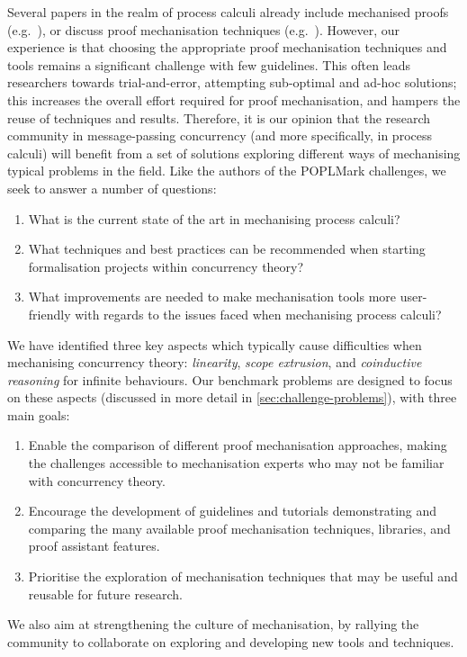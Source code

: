 \documentclass[runningheads]{llncs}
\begin{document}
Several papers in the realm of process calculi already include mechanised proofs
(e.g.~\cite{Castro-Perez2021,Castro2020,lmcs:9985,
  DBLP:journals/jar/CruzFilipeMP23, Tirore:2023}), or
discuss proof mechanisation techniques
(e.g.~\cite{Bengtson2016, Gay2001,
  Thiemann2019, DBLP:conf/forte/ZalakainD21}).  However, our
experience is that choosing the appropriate proof mechanisation techniques and
tools remains a significant challenge with few guidelines.  This often leads
researchers towards trial-and-error, attempting sub-optimal and ad-hoc
solutions; this increases the overall effort required for proof mechanisation,
and hampers the reuse of techniques and results.
%
Therefore, it is our opinion that the research community in message-passing
concurrency (and more specifically, in process calculi) will benefit from a set
of solutions exploring different ways of mechanising typical problems in the
field.
Like the authors of the POPLMark challenges, we seek to
answer a number of questions:
\begin{enumerate}[label=\textbf{(Q\arabic*)},leftmargin=10mm]
\item\label{item:rq1} What is the current state of the art in mechanising process calculi?
\item\label{item:rq2} What techniques and best practices can be recommended when starting formalisation projects within concurrency theory?
\item\label{item:rq3} What improvements are needed to make mechanisation tools more user-friendly with regards to the issues faced when mechanising process calculi?
\end{enumerate}
We have identified three key aspects which typically cause difficulties when
mechanising concurrency theory: \emph{linearity}, \emph{scope extrusion},
and \emph{coinductive reasoning} for infinite behaviours.
Our benchmark problems are designed to focus on these aspects (discussed
in more detail in \cref{sec:challenge-problems}), with three main goals:

\begin{enumerate}[label=\textbf{(G\arabic*)},leftmargin=10mm]
\item\label{item:goal-comperison-accessibility} Enable the comparison of
  different proof mechanisation approaches, making the challenges accessible to
  mechanisation experts who may not be familiar with concurrency theory.

\item\label{item:goal-tutorials} Encourage the development of guidelines and
  tutorials demonstrating and comparing the many available proof mechanisation
  techniques, libraries, and proof assistant features.

\item\label{item:goal-reusability} Prioritise the exploration of mechanisation
  techniques that may be useful and reusable for future research.
\end{enumerate}
We also aim at strengthening the culture of mechanisation, by rallying the
community to collaborate on exploring and developing new tools and techniques.
\end{document}
